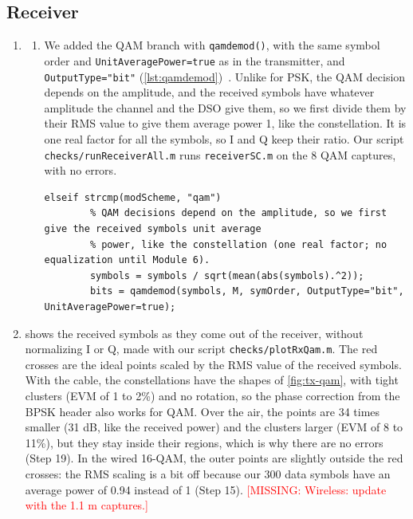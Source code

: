 \documentclass[11pt]{article}
\newcommand{\missing}[1]{\textcolor{red}{[MISSING: #1]}}
\begin{document}
\subsection*{Receiver}
\begin{enumerate}[resume]
    \item
    \begin{enumerate}[label=\alph*)]
        \item We added the QAM branch with \texttt{qamdemod()}, with the same symbol order and \texttt{UnitAveragePower=true} as in the transmitter, and \texttt{OutputType="bit"} (\cref{lst:qamdemod})~\cite{qamdemod}. Unlike for PSK, the QAM decision depends on the amplitude, and the received symbols have whatever amplitude the channel and the DSO give them, so we first divide them by their RMS value to give them average power 1, like the constellation. It is one real factor for all the symbols, so I and Q keep their ratio. Our script \texttt{checks/runReceiverAll.m} runs \texttt{receiverSC.m} on the 8 QAM captures, with no errors.
\begin{lstlisting}[caption={Our change to \texttt{symbolDemapping.m} for M-QAM.}, label={lst:qamdemod}]
    elseif strcmp(modScheme, "qam")
        % QAM decisions depend on the amplitude, so we first give the received symbols unit average
        % power, like the constellation (one real factor; no equalization until Module 6).
        symbols = symbols / sqrt(mean(abs(symbols).^2));
        bits = qamdemod(symbols, M, symOrder, OutputType="bit", UnitAveragePower=true);
\end{lstlisting}
    \end{enumerate}

    \item {} shows the received symbols as they come out of the receiver, without normalizing I or Q, made with our script \texttt{checks/plotRxQam.m}. The red crosses are the ideal points scaled by the RMS value of the received symbols. With the cable, the constellations have the shapes of \cref{fig:tx-qam}, with tight clusters (EVM of 1 to 2\%) and no rotation, so the phase correction from the BPSK header also works for QAM. Over the air, the points are 34 times smaller (31 dB, like the received power) and the clusters larger (EVM of 8 to 11\%), but they stay inside their regions, which is why there are no errors (Step 19). In the wired 16-QAM, the outer points are slightly outside the red crosses: the RMS scaling is a bit off because our 300 data symbols have an average power of 0.94 instead of 1 (Step 15). \missing{Wireless: update with the 1.1 m captures.}


\end{enumerate}
\end{document}
